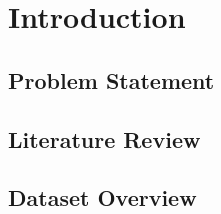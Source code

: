 %
%
\chapter{Introduction}

   
   
   \section{Problem Statement}

   \section{Literature Review}
   
   \section{Dataset Overview}

          
          
